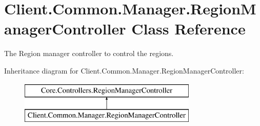 \hypertarget{classClient_1_1Common_1_1Manager_1_1RegionManagerController}{}\section{Client.\+Common.\+Manager.\+Region\+Manager\+Controller Class Reference}
\label{classClient_1_1Common_1_1Manager_1_1RegionManagerController}


The Region manager controller to control the regions.  


Inheritance diagram for Client.\+Common.\+Manager.\+Region\+Manager\+Controller\+:\begin{figure}[H]
\begin{center}
\leavevmode
\includegraphics[height=2.000000cm]{classClient_1_1Common_1_1Manager_1_1RegionManagerController}
\end{center}
\end{figure}
